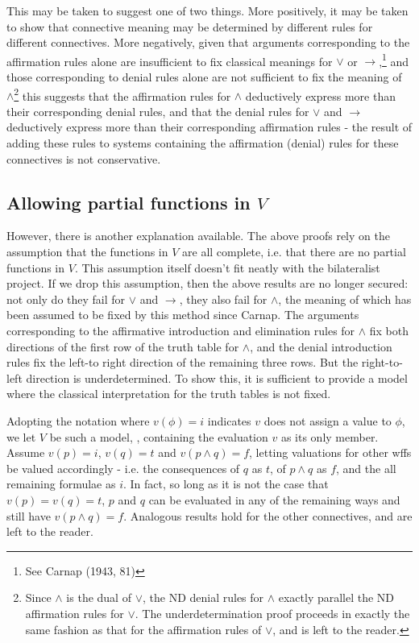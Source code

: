 \documentclass[]{article}
\begin{document}
This may be taken to suggest one of two things. More positively, it may be taken to show that connective meaning may be determined by different rules for different connectives. More negatively, given that arguments corresponding to the affirmation rules alone are insufficient to fix classical meanings for $\vee$ or $\rightarrow$,\footnote{See Carnap (1943, 81)} and those corresponding to denial rules alone are not sufficient to fix the meaning of $\wedge$\footnote{Since $\wedge$ is the dual of $\vee$, the ND denial rules for $\wedge$ exactly parallel the ND affirmation rules for $\vee$. The underdetermination proof proceeds in exactly the same fashion as that for the affirmation rules of $\vee$, and is left to the reader.} this suggests that the affirmation rules for $\wedge$ deductively express more than their corresponding denial rules, and that the denial rules for $\vee$ and $\rightarrow$ deductively express more than their corresponding affirmation rules - the result of adding these rules to systems containing the affirmation (denial) rules for these connectives is not conservative.

\subsection{Allowing partial functions in $V$}
However, there is another explanation available. The above proofs rely on the assumption that the functions in $V$ are all complete, i.e. that there are no partial functions in $V$. This assumption itself doesn't fit neatly with the bilateralist project. If we drop this assumption, then the above results are no longer secured: not only do they fail for $\vee$ and $\rightarrow$, they also fail for $\wedge$, the meaning of which has been assumed to be fixed by this method since Carnap. The arguments corresponding to the affirmative introduction and elimination rules for $\wedge$ fix both directions of the first row of the truth table for $\wedge$, and the denial introduction rules fix the left-to right direction of the remaining three rows. But the right-to-left direction is underdetermined. To show this, it is sufficient to provide a model where the classical interpretation for the truth tables is not fixed.

Adopting the notation where $v(\phi) = i$ indicates $v$ does not assign a value to $\phi$, we let $V$ be such a model, , containing the evaluation $v$ as its only member. Assume $v(p) = i$, $v(q) = t$ and $v(p\wedge q) = f$, letting valuations for other wffs be valued accordingly - i.e. the consequences of $q$ as $t$, of $p\wedge q$ as $f$, and the all remaining formulae as $i$. In fact, so long as it is not the case that $v(p) = v(q) = t$, $p$ and $q$ can be evaluated in any of the remaining ways and still have $v(p\wedge q) = f$. Analogous results hold for the other connectives, and are left to the reader.
\end{document}
